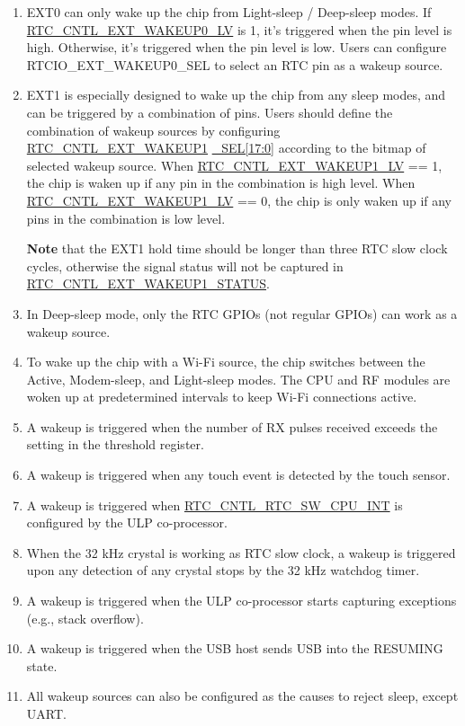 \documentclass[main\_\_EN.tex]{subfiles}
\begin{document}
\begin{tiplisting}
\vspace{-2em}
\begin{enumerate}
    \item EXT0 can only wake up the chip from Light-sleep / Deep-sleep modes. If \hyperref[fielddesc:RTCCNTLEXTWAKEUP0LV]{RTC\_CNTL\_EXT\_WAKEUP0\_LV} is 1, it's triggered when the pin level is high. Otherwise, it's triggered when the pin level is low. Users can configure RTCIO\_EXT\_WAKEUP0\_SEL to select an RTC pin as a wakeup source.
    \item EXT1 is especially designed to wake up the chip from any sleep modes, and can be triggered by a combination of pins. Users should define the combination of wakeup sources by configuring \hyperref[fielddesc:RTCCNTLEXTWAKEUP1SEL]{RTC\_CNTL\_EXT\_WAKEUP1} \hyperref[fielddesc:RTCCNTLEXTWAKEUP1SEL]{\_SEL[17:0]} according to the bitmap of selected wakeup source. When \hyperref[fielddesc:RTCCNTLEXTWAKEUP1LV]{RTC\_CNTL\_EXT\_WAKEUP1\_LV} == 1, the chip is waken up if any pin in the combination is high level. When \hyperref[fielddesc:RTCCNTLEXTWAKEUP1LV]{RTC\_CNTL\_EXT\_WAKEUP1\_LV} == 0, the chip is only waken up if any pins in the combination is low level.

    {\bfseries Note} that the EXT1 hold time should be longer than three RTC slow clock cycles, otherwise the signal status will not be captured in \hyperref[regdesc:RTCCNTLEXTWAKEUP1STATUSREG]{RTC\_CNTL\_EXT\_WAKEUP1\_STATUS}.
    \item In Deep-sleep mode, only the RTC GPIOs (not regular GPIOs) can work as a wakeup source.
    \item To wake up the chip with a Wi-Fi source, the chip switches between the Active, Modem-sleep, and Light-sleep modes. The CPU and RF modules are woken up at predetermined intervals to keep Wi-Fi connections active.
    \item A wakeup is triggered when the number of RX pulses received exceeds the setting in the threshold register.
    \item A wakeup is triggered when any touch event is detected by the touch sensor.
    \item A wakeup is triggered when \hyperref[fielddesc:RTCCNTLRTCSWCPUINT]{RTC\_CNTL\_RTC\_SW\_CPU\_INT} is configured by the ULP co-processor.
    \item When the 32 kHz crystal is working as RTC slow clock, a wakeup is triggered upon any detection of any crystal stops by the 32 kHz watchdog timer.
    \item A wakeup is triggered when the ULP co-processor starts capturing exceptions (e.g., stack overflow).
    \item A wakeup is triggered when the USB host sends USB into the RESUMING state.
    \item All wakeup sources can also be configured as the causes to reject sleep, except UART. \\
\end{enumerate}
\end{tiplisting}
\end{document}
